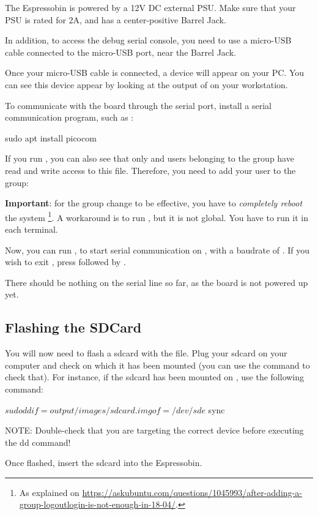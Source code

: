 The Espressobin is powered by a 12V DC external PSU. Make sure that your PSU is rated for 2A, and has a center-positive Barrel Jack.

In addition, to access the debug serial console, you need to use a
micro-USB cable connected to the micro-USB port, near the Barrel Jack.

Once your micro-USB cable is connected, a  device
will appear on your PC. You can see this device appear by looking at
the output of  on your workstation.

To communicate with the board through the serial port, install a
serial communication program, such as :

\begin{hostbashinput}
sudo apt install picocom
\end{hostbashinput}

If you run , you can also see that only
 and users belonging to the  group have read
and write access to this file. Therefore, you need to add your user to
the  group:


{\bf Important}: for the group change to be effective, you have to
{\em completely reboot} the system \footnote{As explained on
\url{https://askubuntu.com/questions/1045993/after-adding-a-group-logoutlogin-is-not-enough-in-18-04/}.}.
A workaround is to run , but it is not global.
You have to run it in each terminal.

Now, you can run , to start
serial communication on , with a baudrate of
. If you wish to exit , press
\code{[Ctrl][a]} followed by \code{[Ctrl][x]}.

There should be nothing on the serial line so far, as the board is not
powered up yet.



\subsection{Flashing the SDCard}

You will now need to flash a sdcard with the 
 file. Plug your sdcard on your computer and
check on which  it has been mounted (you can use the 
command to check that). For instance, if the sdcard has been mounted on
, use the following command:

\begin{hostbashinput}
$ sudo dd if=output/images/sdcard.img of=/dev/sde
$ sync
\end{hostbashinput}

NOTE: Double-check that you are targeting the correct device before executing
the dd command!

Once flashed, insert the sdcard into the Espressobin.

